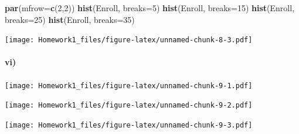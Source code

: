 \documentclass[]{article}
\newenvironment{Shaded}{\begin{snugshade}}{\end{snugshade}}
\newcommand{\KeywordTok}[1]{\textcolor[rgb]{0.13,0.29,0.53}{\textbf{#1}}}
\newcommand{\DataTypeTok}[1]{\textcolor[rgb]{0.13,0.29,0.53}{#1}}
\newcommand{\DecValTok}[1]{\textcolor[rgb]{0.00,0.00,0.81}{#1}}
\newcommand{\OperatorTok}[1]{\textcolor[rgb]{0.81,0.36,0.00}{\textbf{#1}}}
\newcommand{\NormalTok}[1]{#1}
\let\oldparagraph\paragraph
\renewcommand{\paragraph}[1]{\oldparagraph{#1}\mbox{}}
\begin{document}
\begin{Shaded}
\begin{Highlighting}[]
\KeywordTok{par}\NormalTok{(}\DataTypeTok{mfrow=}\KeywordTok{c}\NormalTok{(}\DecValTok{2}\NormalTok{,}\DecValTok{2}\NormalTok{))}
\KeywordTok{hist}\NormalTok{(Enroll, }\DataTypeTok{breaks=}\DecValTok{5}\NormalTok{)}
\KeywordTok{hist}\NormalTok{(Enroll, }\DataTypeTok{breaks=}\DecValTok{15}\NormalTok{)}
\KeywordTok{hist}\NormalTok{(Enroll, }\DataTypeTok{breaks=}\DecValTok{25}\NormalTok{)}
\KeywordTok{hist}\NormalTok{(Enroll, }\DataTypeTok{breaks=}\DecValTok{35}\NormalTok{)}
\end{Highlighting}
\end{Shaded}

\texttt{[image: Homework1\_files/figure-latex/unnamed-chunk-8-3.pdf]}

\paragraph{vi)}\label{vi}

\begin{Shaded}
\end{Shaded}

\texttt{[image: Homework1\_files/figure-latex/unnamed-chunk-9-1.pdf]}

\begin{Shaded}
\end{Shaded}

\texttt{[image: Homework1\_files/figure-latex/unnamed-chunk-9-2.pdf]}

\begin{Shaded}
\end{Shaded}

\texttt{[image: Homework1\_files/figure-latex/unnamed-chunk-9-3.pdf]}

\begin{Shaded}
\end{Shaded}
\end{document}
